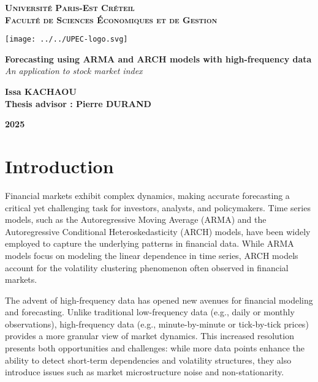 \documentclass[a4paper, 12pt]{article}
\begin{document}
	\begin{titlepage}
		\centering
		\vspace*{0.5cm}
\textsc{{\LARGE \textbf{Université Paris-Est Créteil}}} \\
\vspace*{0.5cm}
\textsc{{\LARGE \textbf{Faculté de Sciences Économiques et de Gestion}}}
\vspace*{2cm}

		\begin{center}
\texttt{[image: ../../UPEC-logo.svg]}
		\end{center}
		\vspace*{2cm}
		
		\LARGE
		
		\textbf{Forecasting using ARMA and ARCH models with high-frequency data}\\
			\textit{An application to stock market index}\\
		\vspace{1cm}		
		\Large

		\vspace{1cm}
		
		\textbf{Issa KACHAOU}\\
		\large
		\textbf{Thesis advisor : Pierre DURAND} \\
		
		
		
		\vfill
		
		\Large

		\textbf{2025}
		
	\end{titlepage}

\pagestyle{plain}
\part{Introduction}

Financial markets exhibit complex dynamics, making accurate forecasting a critical yet challenging task for investors, analysts, and policymakers. Time series models, such as the Autoregressive Moving Average (ARMA) and the Autoregressive Conditional Heteroskedasticity (ARCH) models, have been widely employed to capture the underlying patterns in financial data. While ARMA models focus on modeling the linear dependence in time series, ARCH models account for the volatility clustering phenomenon often observed in financial markets.

The advent of high-frequency data has opened new avenues for financial modeling and forecasting. Unlike traditional low-frequency data (e.g., daily or monthly observations), high-frequency data (e.g., minute-by-minute or tick-by-tick prices) provides a more granular view of market dynamics. This increased resolution presents both opportunities and challenges: while more data points enhance the ability to detect short-term dependencies and volatility structures, they also introduce issues such as market microstructure noise and non-stationarity.
\end{document}
